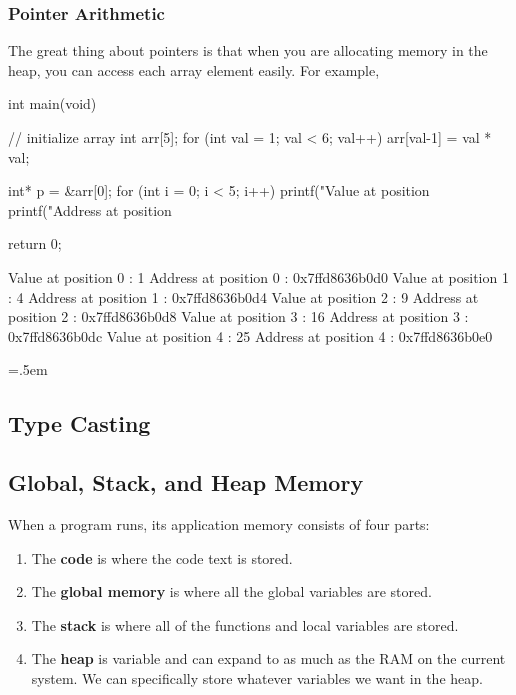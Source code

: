 \documentclass{article}
\theoremstyle{definition}
\newenvironment{cverbatim}
   {\SaveVerbatim{cverb}}
   {\endSaveVerbatim
    \flushleft\fboxrule=0pt\fboxsep=.5em
    \colorbox{cverbbg}{%
      \makebox[\dimexpr\linewidth-2\fboxsep][l]{\BUseVerbatim{cverb}}%
    }
    \endflushleft
  }
\begin{document}
    \subsubsection{Pointer Arithmetic} 

      The great thing about pointers is that when you are allocating memory in the heap, you can access each array element easily. For example, 

      \begin{cverbatim} 
int main(void) {

  // initialize array 
  int arr[5]; 
  for (int val = 1; val < 6; val++) {
    arr[val-1] = val * val;
  }

  int* p = &arr[0]; 
  for (int i = 0; i < 5; i++) {
    printf("Value at position %
    printf("Address at position %
  }

  return 0; 
}        

Value at position 0 : 1
Address at position 0 : 0x7ffd8636b0d0
Value at position 1 : 4
Address at position 1 : 0x7ffd8636b0d4
Value at position 2 : 9
Address at position 2 : 0x7ffd8636b0d8
Value at position 3 : 16
Address at position 3 : 0x7ffd8636b0dc
Value at position 4 : 25
Address at position 4 : 0x7ffd8636b0e0

      \end{cverbatim}

  \subsection{Type Casting}



  \subsection{Global, Stack, and Heap Memory}

    When a program runs, its application memory consists of four parts: 

    \begin{enumerate} 
      \item The \textbf{code} is where the code text is stored. 
      \item The \textbf{global memory} is where all the global variables are stored. 
      \item The \textbf{stack} is where all of the functions and local variables are stored. 
      \item The \textbf{heap} is variable and can expand to as much as the RAM on the current system. We can specifically store whatever variables we want in the heap.
    \end{enumerate}
\end{document}
